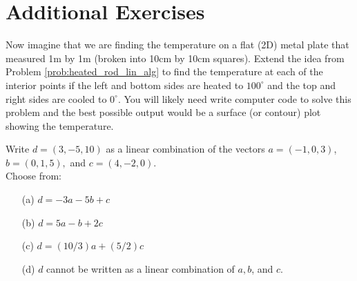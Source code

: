 \newpage\section{Additional Exercises}


\begin{problem}
    Now imagine that we are finding the temperature on a flat (2D) metal plate that
    measured 1m
    by 1m (broken into 10cm by 10cm squares).  Extend the idea from Problem
    \ref{prob:heated_rod_lin_alg} to find the temperature at each of
    the interior points if the left and bottom sides are heated to $100^\circ$ and the top
    and right sides are cooled to $0^\circ$.  You will likely need write computer code to
    solve this problem and the best possible output would be a surface (or contour) plot
    showing the temperature.
\end{problem}

\begin{problem}
    Write $d = (3,-5,10)$ as a linear combination of the vectors $a = (-1,0,3)$,
    $b = (0,1,5),$ and $c = (4,-2,0)$. \\
    Choose from:
    \begin{enumerate}
        \item[(a)] $d = -3a - 5b + c$
        \item[(b)] $d = 5a - b + 2c$
        \item[(c)] $d = (10/3)a + (5/2)c$
        \item[(d)] $d$ cannot be written as a linear combination of $a, b$, and $c$.
    \end{enumerate}
\end{problem}

%             
% 


